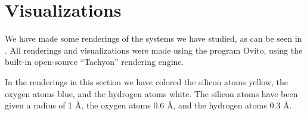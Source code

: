 \section{Visualizations}
We have made some renderings of the systems we have studied, as can be seen in . All renderings and visualizations were made using the program Ovito\cite{stukowski2010ovito}, using the built-in open-source ``Tachyon'' rendering engine.

In the renderings in this section we have colored the silicon atoms yellow, the oxygen atoms blue, and the hydrogen atoms white. The silicon atoms have been given a radius of 1 \AA, the oxygen atoms 0.6 \AA, and the hydrogen atoms 0.3 \AA.

%
\begin{figure}[!p]%
    \setlength{\myfigwidth}{0.55\textwidth}%
    \setlength{\myhfillwidth}{5mm}%
\end{figure}
